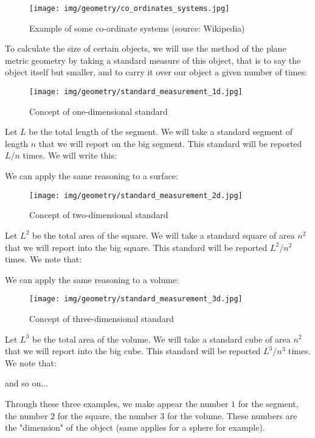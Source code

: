 	\begin{figure}[H]
		\centering
		\texttt{[image: img/geometry/co\_ordinates\_systems.jpg]}
		\caption[Example of some co-ordinate systems]{Example of some co-ordinate systems (source: Wikipedia)}
	\end{figure}

	To calculate the size of certain objects, we will use the method of the plane metric geometry by taking a standard measure of this object, that is to say the object itself but smaller, and to carry it over our object a given number of times:
	\begin{figure}[H]
		\centering
		\texttt{[image: img/geometry/standard\_measurement\_1d.jpg]}
		\caption{Concept of one-dimensional standard}
	\end{figure}
	Let $L$ be the total length of the segment. We will take a standard segment of length $n$ that we will report on the big segment. This standard will be reported $L / n$ times. We will write this:
	
	We can apply the same reasoning to a surface:
	\begin{figure}[H]
		\centering
		\texttt{[image: img/geometry/standard\_measurement\_2d.jpg]}
		\caption{Concept of two-dimensional standard}
	\end{figure}
	Let $L^2$ be the total area of the square. We will take a standard square of area $n^2$ that we will report into the big square. This standard will be reported $L^2 / n^2$ times. We note that:
	
	We can apply the same reasoning to a volume:
	\begin{figure}[H]
		\centering
		\texttt{[image: img/geometry/standard\_measurement\_3d.jpg]}
		\caption{Concept of three-dimensional standard}
	\end{figure}
	Let $L^3$ be the total area of the volume. We will take a standard cube of area $n^2$ that we will report into the big cube. This standard will be reported $L^3 / n^3$ times. We note that:
	
	and so on...
	
	Through these three examples, we make appear the number $1$ for the segment,  the number $2$ for the square, the number $3$ for the volume. These numbers are the "dimension" of the object (same applies for a sphere for example).
	
